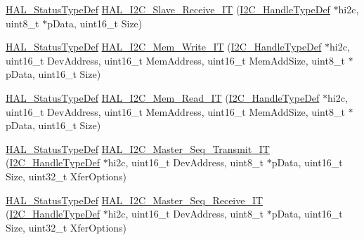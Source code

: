 \begin{DoxyCompactItemize}
\item 
\hyperlink{stm32f4xx__hal__def_8h_a63c0679d1cb8b8c684fbb0632743478f}{H\+A\+L\+\_\+\+Status\+Type\+Def} \hyperlink{group___i2_c___exported___functions___group2_ga48113a4abed4b32ac19da51babb530eb}{H\+A\+L\+\_\+\+I2\+C\+\_\+\+Slave\+\_\+\+Receive\+\_\+\+IT} (\hyperlink{group___i2_c__handle___structure__definition_ga68e9f45c2fd2161fb827ccdeabb55ea5}{I2\+C\+\_\+\+Handle\+Type\+Def} $\ast$hi2c, uint8\+\_\+t $\ast$p\+Data, uint16\+\_\+t Size)
\item 
\hyperlink{stm32f4xx__hal__def_8h_a63c0679d1cb8b8c684fbb0632743478f}{H\+A\+L\+\_\+\+Status\+Type\+Def} \hyperlink{group___i2_c___exported___functions___group2_gab57ffc32b01392d8bcce3c7ec32b3120}{H\+A\+L\+\_\+\+I2\+C\+\_\+\+Mem\+\_\+\+Write\+\_\+\+IT} (\hyperlink{group___i2_c__handle___structure__definition_ga68e9f45c2fd2161fb827ccdeabb55ea5}{I2\+C\+\_\+\+Handle\+Type\+Def} $\ast$hi2c, uint16\+\_\+t Dev\+Address, uint16\+\_\+t Mem\+Address, uint16\+\_\+t Mem\+Add\+Size, uint8\+\_\+t $\ast$p\+Data, uint16\+\_\+t Size)
\item 
\hyperlink{stm32f4xx__hal__def_8h_a63c0679d1cb8b8c684fbb0632743478f}{H\+A\+L\+\_\+\+Status\+Type\+Def} \hyperlink{group___i2_c___exported___functions___group2_ga2274a9d894a1dc783bc647f937200f65}{H\+A\+L\+\_\+\+I2\+C\+\_\+\+Mem\+\_\+\+Read\+\_\+\+IT} (\hyperlink{group___i2_c__handle___structure__definition_ga68e9f45c2fd2161fb827ccdeabb55ea5}{I2\+C\+\_\+\+Handle\+Type\+Def} $\ast$hi2c, uint16\+\_\+t Dev\+Address, uint16\+\_\+t Mem\+Address, uint16\+\_\+t Mem\+Add\+Size, uint8\+\_\+t $\ast$p\+Data, uint16\+\_\+t Size)
\item 
\hyperlink{stm32f4xx__hal__def_8h_a63c0679d1cb8b8c684fbb0632743478f}{H\+A\+L\+\_\+\+Status\+Type\+Def} \hyperlink{group___i2_c___exported___functions___group2_ga6a55d04a460664f6b2039b2a7b56a9de}{H\+A\+L\+\_\+\+I2\+C\+\_\+\+Master\+\_\+\+Seq\+\_\+\+Transmit\+\_\+\+IT} (\hyperlink{group___i2_c__handle___structure__definition_ga68e9f45c2fd2161fb827ccdeabb55ea5}{I2\+C\+\_\+\+Handle\+Type\+Def} $\ast$hi2c, uint16\+\_\+t Dev\+Address, uint8\+\_\+t $\ast$p\+Data, uint16\+\_\+t Size, uint32\+\_\+t Xfer\+Options)
\item 
\hyperlink{stm32f4xx__hal__def_8h_a63c0679d1cb8b8c684fbb0632743478f}{H\+A\+L\+\_\+\+Status\+Type\+Def} \hyperlink{group___i2_c___exported___functions___group2_ga0caa34de50971b2bd5b953ee12af94f1}{H\+A\+L\+\_\+\+I2\+C\+\_\+\+Master\+\_\+\+Seq\+\_\+\+Receive\+\_\+\+IT} (\hyperlink{group___i2_c__handle___structure__definition_ga68e9f45c2fd2161fb827ccdeabb55ea5}{I2\+C\+\_\+\+Handle\+Type\+Def} $\ast$hi2c, uint16\+\_\+t Dev\+Address, uint8\+\_\+t $\ast$p\+Data, uint16\+\_\+t Size, uint32\+\_\+t Xfer\+Options)

\end{DoxyCompactItemize}
